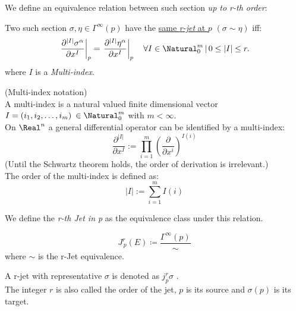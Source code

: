 \documentclass[Main]{subfiles}
\begin{document}
			We define an equivalence relation between such section \emph{up to r-th order}:
			\begin{definition}
				Two such section $\sigma, \eta \in \Gamma^\infty(p)$ have the \underline{same \emph{r-jet} at $p$} $(\sigma \sim \eta)$ 
				iff:
				\begin{displaymath}
					\left.\frac{\partial^{|I|} \sigma^{\alpha}}{\partial x^{I}}\right|_{p} = \left.\frac{\partial^{|I|} \eta^{\alpha}}{\partial x^{I}}\right|_{p} 
					\quad \forall I\in \Natural^m_0 \, \vert \, 0 \leq |I| \leq r.
				\end{displaymath}	
				where $I$ is a \emph{Multi-index}.	
			\end{definition}
			\begin{remark}
				(Multi-index notation)
				\\
				A multi-index is a natural valued finite dimensional vector  $I=(i_1, i_2, \ldots, i_m)\: \in \Natural^m_0$ with $m<\infty$.
				\\
				On $\Real^n$ a general differential operator can be identified by a multi-index:
				\begin{displaymath}
					\frac{\partial^{|I|}}{\partial x^{I}} := \prod_{i=1}^{m} \left( \frac{\partial}{\partial x^{i}} \right)^{I(i)}
				\end{displaymath}
				(Until the Schwartz theorem holds, the order of derivation is irrelevant.)
				\\
				The order of the multi-index is defined as:
				\begin{displaymath}
					|I| := \sum_{i=1}^{m} I(i)
				\end{displaymath}
			\end{remark}
	
			We define the \emph{r-th Jet in p} as the equivalence class under this relation.
			\begin{definition}
				\begin{displaymath}
					J^r_{\,p}(E) \coloneqq \frac{\Gamma^\infty(p)}{\sim}
				\end{displaymath}
				where $\sim$ is the r-Jet equivalence.
			\end{definition}
			\begin{notationfix} 
				A r-jet with representative $\sigma$ is denoted as $j^r_p\sigma$ . 
				\\
				The integer $r$ is also called the order of the jet, $p$ is its source and $\sigma(p)$ is its target.
			\end{notationfix}
	
\end{document}
